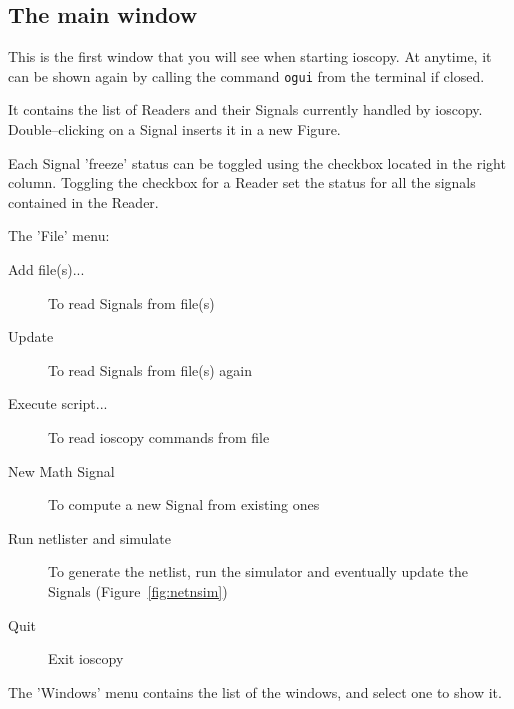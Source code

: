 \documentclass[a4paper,11pt]{article}
\begin{document}
\subsection{The main window}
This is the first window that you will see when starting ioscopy.
At anytime, it can be shown again by calling the command \texttt{ogui} from the terminal if closed.

It contains the list of Readers and their Signals currently handled by ioscopy.
Double--clicking on a Signal inserts it in a new Figure.

Each Signal 'freeze' status can be toggled using the checkbox located in the right column.
Toggling the checkbox for a Reader set the status for all the signals contained in the Reader.

The 'File' menu:
\begin{description}
\item[Add file(s)...] To read Signals from file(s)
\item[Update] To read Signals from file(s) again
\item[Execute script...] To read ioscopy commands from file
\item[New Math Signal] To compute a new Signal from existing ones
\item[Run netlister and simulate] To generate the netlist, run the simulator and eventually update the Signals (Figure~\ref{fig:netnsim})
\item[Quit] Exit ioscopy
\end{description}

The 'Windows' menu contains the list of the windows, and select one to show it.

\end{document}
